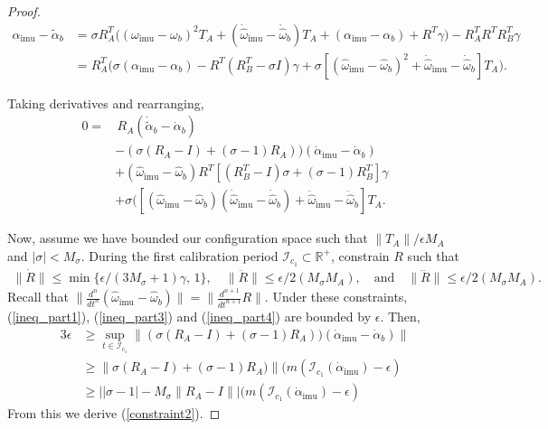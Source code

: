 \documentclass[]{article}
\def\w{\omega}
\def\hw{{\widehat\w}}
\def\RR{\mathbb{R}}
\def\subs{\subset}
\def\imu{_\mathrm{imu}}
\def\m{{m}}
\def\I{\mathcal{I}}
\begin{document}
\begin{proof}
\begin{align*}
\alpha\imu - \tilde \alpha_b &= \sigma R_A^T \bigl(({\w}\imu  - {\w}_b )^2 T_A 
+ (\dot{\hw}\imu  - \dot{\hw}_b ) T_A
+ (\alpha\imu  -\alpha_b) + R^T \gamma \bigr) - R_A^T R^T R_B^T \gamma \\
&= R^T_A\bigl(
\sigma (\alpha\imu-\alpha_b) - R^T(R_B^T - \sigma I)\gamma 
+ \sigma [(\hw\imu  - \hw_b)^2 + \dot{\hw}\imu  - \dot{\hw}_b ] T_A 
\bigr).
\end{align*}

Taking derivatives and rearranging,
\begin{align}
0 =&\, R_A(\dot{\tilde\alpha}_b - \dot\alpha_b) \label{ineq_part1}\\
&- (\sigma(R_A-I) + (\sigma-1)R_A))(\dot\alpha\imu-\dot\alpha_b) \label{ineq_part2}\\
&+(\hw\imu - \hw_b)R^T[(R_B^T - I) \sigma + (\sigma-1)R_B^T]\gamma \label{ineq_part3}\\
&+ \sigma ([(\hw\imu  - \hw_b)(\dot\hw\imu  - \dot\hw_b) + \ddot{\hw}\imu  - \ddot{\hw}_b ] T_A. \label{ineq_part4}
\end{align}

Now, assume we have bounded our configuration space such that
$\|T_A\|/\epsilon M_A$ and $|\sigma|<M_\sigma$. 
During the first calibration period $\I_{c_1}\subs\RR^+$, constrain $R$ such that 
\begin{align}
\|\dot R\|\leq\min\{\epsilon/(3M_\sigma+1)\gamma,\,1\},\quad
\|\ddot R\|\leq\epsilon/2(M_\sigma M_A),\quad\text{and}\quad
\|\dddot R\|\leq\epsilon/2(M_\sigma M_A). \label{calib_constraints}
\end{align}
Recall that $\|\tfrac{d^n}{dt^n}(\hw\imu-\hw_b)\|=\|\tfrac{d^{n+1}}{dt^{n+1}}R\|$.
Under these constraints, (\ref{ineq_part1}), (\ref{ineq_part3}) and (\ref{ineq_part4}) are bounded by
$\epsilon$.  Then,
\begin{align*}
3\epsilon&\geq\sup_{t\in\I_{c_1}}\|(\sigma(R_A-I) + (\sigma-1)R_A))(\dot\alpha\imu-\dot\alpha_b)\|\\
&\geq\|\sigma(R_A-I) + (\sigma-1)R_A)\|(\m({\I_{c_1}}(\dot\alpha\imu) - \epsilon)\\
&\geq\bigl||\sigma-1| - M_\sigma\|R_A-I\|\bigr|(\m({\I_{c_1}}(\dot\alpha\imu) - \epsilon)
\end{align*}
From this we derive (\ref{constraint2}).


\end{proof}
\end{document}
